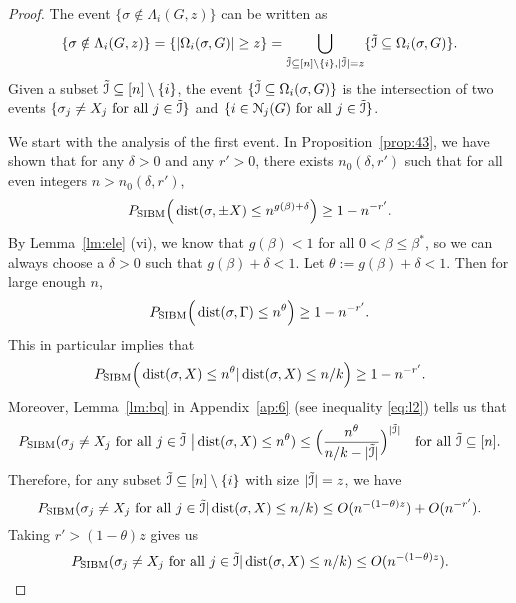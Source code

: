 \documentclass{article}
\begin{document}
\begin{proof}
The event $\{\sigma\notin \Lambda_i(G, z) \}$ can be written as
\begin{equation} \label{eq:lei}
\{\sigma\notin \Lambda_i(G, z) \}
=\{|\Omega_i(\sigma,G)| \ge z \}
=\bigcup_{\tilde{\mathcal{I}}\subseteq[n]\setminus\{i\}, |\tilde{\mathcal{I}}| = z} \{\tilde{\mathcal{I}} \subseteq \Omega_i(\sigma,G)\} .
\end{equation}
Given a subset $\tilde{\mathcal{I}}\subseteq[n]\setminus\{i\}$,
the event $\{\tilde{\mathcal{I}} \subseteq \Omega_i(\sigma,G) \}$ is the intersection of two events $\{\sigma_j \neq X_j \text{~for all~} j\in \tilde{\mathcal{I}}\}$ and $\{i\in\mathcal{N}_j(G) \text{~for all~} j\in \tilde{\mathcal{I}}\}$.

We start with the analysis of the first event.
In Proposition~\ref{prop:43}, we have shown that
for any $\delta>0$ and any $r'>0$, there exists $n_0(\delta, r')$ such that for all even integers $n>n_0(\delta, r')$,
$$ 
P_{\operatorname{SIBM}} \Big(\operatorname{dist}(\sigma,\pm X) \le n^{g(\beta)+\delta}
 \Big) \ge 1- n^{-r'} .
$$
By Lemma~\ref{lm:ele} (vi), we know that $g(\beta)<1$ for all $0<\beta\le\beta^\ast$, so we can always choose a $\delta>0$ such that $g(\beta)+\delta<1$.
Let $\theta:=g(\beta)+\delta<1$. Then for large enough $n$,
$$
P_{\operatorname{SIBM}} \Big(\operatorname{dist}(\sigma, \Gamma) \le n^{\theta} \Big) \ge 1- n^{-r'} .
$$
This in particular implies that
$$
P_{\operatorname{SIBM}} \Big(\operatorname{dist}(\sigma, X) \le n^{\theta} | \operatorname{dist}(\sigma, X) \le n/k
\Big) \ge 1- n^{-r'} .
$$
Moreover, Lemma~\ref{lm:bq} in Appendix~\ref{ap:6} (see inequality \eqref{eq:l2}) tells us that
$$
 P_{\operatorname{SIBM}}(\sigma_j \neq X_j \text{~for all~}  j\in\tilde{\mathcal{I}}
~\big| \operatorname{dist}(\sigma,X) \le n^\theta) \le \Big(\frac{n^\theta}{n/k-|\tilde{\mathcal{I}}|}
\Big)^{|\tilde{\mathcal{I}}|}
\quad \text{for all~} \tilde{\mathcal{I}}\subseteq [n] .
$$
Therefore, for any subset $\tilde{\mathcal{I}}\subseteq[n]\setminus\{i\}$ with size $|\tilde{\mathcal{I}}|=z$, we have
$$
P_{\operatorname{SIBM}}(\sigma_j \neq X_j \text{~for all~} j\in \tilde{\mathcal{I}}
| \operatorname{dist}(\sigma, X) \le n/k )
\le O(n^{-(1-\theta) z}) + O(n^{-r'}) . 
$$
Taking $r'>(1-\theta) z$ gives us
\begin{equation} \label{eq:gr}
P_{\operatorname{SIBM}}(\sigma_j \neq X_j \text{~for all~} j\in \tilde{\mathcal{I}}
| \operatorname{dist}(\sigma, X) \le n/k )
\le O(n^{-(1-\theta) z}) . 
\end{equation}


\end{proof}
\end{document}
